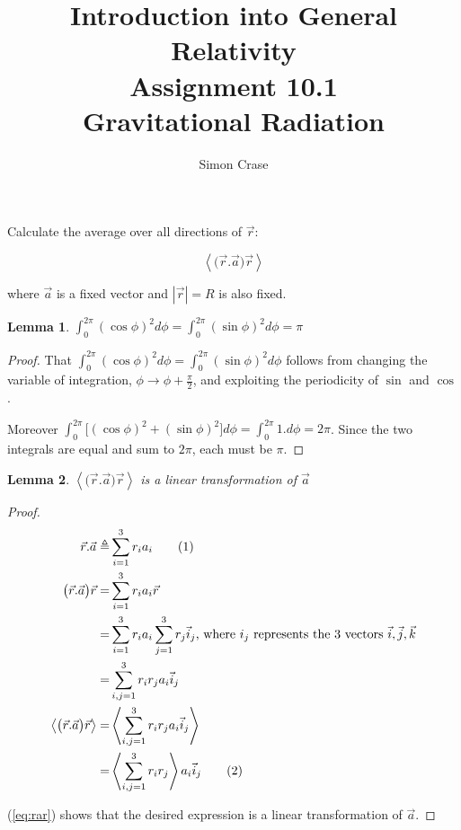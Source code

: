 \documentclass[]{article}
\title{Introduction into General Relativity\\Assignment 10.1\\Gravitational Radiation}
\author{Simon Crase}
\newcommand\numberthis{\addtocounter{equation}{1}\tag{\theequation}}
\newtheorem{lemma}{Lemma}
\begin{document}
\maketitle

Calculate the average over all directions of $\vec{r}$:

$$\left\langle \big(\vec{r}.\vec{a}\big)\vec{r} \right\rangle$$

where $\vec{a}$ is a fixed vector and $|\vec{r}|=R$ is also fixed.

\begin{lemma}\label{lemma:i1}
	$\int_{0}^{2\pi}(\cos\phi)^2  d\phi = \int_{0}^{2\pi}(\sin\phi)^2  d\phi=\pi$
\end{lemma}
\begin{proof}
	That $\int_{0}^{2\pi}(\cos\phi)^2  d\phi = \int_{0}^{2\pi}(\sin\phi)^2  d\phi$ follows from changing the variable of integration, $\phi\rightarrow\phi+\frac{\pi}{2}$, and exploiting the periodicity of $\sin$ and $\cos$. 
	
	Moreover $\int_{0}^{2\pi}\big[(\cos\phi)^2  +(\sin\phi)^2\big] d\phi=\int_{0}^{2\pi}1. d\phi=2\pi$. Since the two integrals are equal and sum to $2\pi$, each must be $\pi$.
\end{proof}

\begin{lemma}\label{lemma:linearity}
	$\left\langle \big(\vec{r}.\vec{a}\big)\vec{r} \right\rangle$ is a linear transformation of $\vec{a}$
\end{lemma}
\begin{proof}
\begin{align*}
\vec{r}.\vec{a} \triangleq& \sum_{i=1}^{3}r_ia_i\numberthis\label{eq:ra}\\
\big(\vec{r}.\vec{a}\big)\vec{r} =& \sum_{i=1}^{3}r_ia_i \vec{r}\\
=& \sum_{i=1}^{3}r_ia_i \sum_{j=1}^{3}r_j\vec{i}_j \text{, where $i_j$ represents the 3 vectors $\vec{i},\vec{j},\vec{k}$}\\
=& \sum_{i,j=1}^{3}r_i  r_j a_i \vec{i}_j \\
\left\langle \big(\vec{r}.\vec{a}\big)\vec{r} \right\rangle=&\left\langle \sum_{i,j=1}^{3}r_i  r_j a_i \vec{i}_j\right\rangle\\
=&\left\langle \sum_{i,j=1}^{3}r_i  r_j\right\rangle a_i \vec{i}_j
\numberthis\label{eq:rar}
\end{align*}

(\ref{eq:rar}) shows that the desired expression is a linear transformation of $\vec{a}$.
\end{proof}
\end{document}
